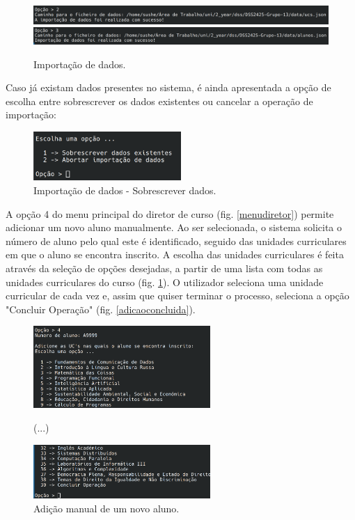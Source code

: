 \documentclass[12pt, a4paper]{article}
\begin{document}
\begin{figure}[H]
    \centering
    \includegraphics[width=1\textwidth]{Imagens/Manual/DiretorCurso-2.png}
    \includegraphics[width=1\textwidth]{Imagens/Manual/DiretorCurso-3.png}
    \caption{Importação de dados.}
\end{figure}

Caso já existam dados presentes no sistema, é ainda apresentada a opção de escolha entre
sobrescrever os dados existentes ou cancelar a operação de importação:

\begin{figure}[H]
    \centering
    \includegraphics[width=0.5\textwidth]{Imagens/Manual/DiretorCurso-SobrescreverDados.png}
    \caption{Importação de dados - Sobrescrever dados.}
\end{figure}

A opção 4 do menu principal do diretor de curso (fig. \ref{menudiretor}) permite adicionar um novo
aluno manualmente. Ao ser selecionada, o sistema solicita o número de aluno pelo qual este é
identificado, seguido das unidades curriculares em que o aluno se encontra inscrito. A escolha das
unidades curriculares é feita através da seleção de opções desejadas, a partir de uma lista com
todas as unidades curriculares do curso (fig. \ref{listaucs}). O utilizador seleciona uma unidade
curricular de cada vez e, assim que quiser terminar o processo, seleciona a opção
"Concluir Operação" (fig. \ref{adicaoconcluida}).

\begin{figure}[H]
    \centering
    \includegraphics[width=0.6\textwidth]{Imagens/Manual/DiretorCurso-4-1.png}

    (...)

    \includegraphics[width=0.6\textwidth]{Imagens/Manual/DiretorCurso-4-2.png}
    \caption{Adição manual de um novo aluno.}
    \label{listaucs}
\end{figure}
\end{document}

